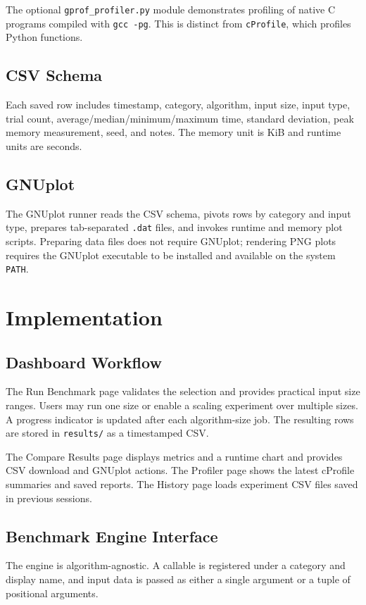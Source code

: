 \documentclass[11pt,a4paper]{report}
\begin{document}
The optional \texttt{gprof\_profiler.py} module demonstrates profiling of
native C programs compiled with \texttt{gcc -pg}. This is distinct from
\texttt{cProfile}, which profiles Python functions.

\section{CSV Schema}
Each saved row includes timestamp, category, algorithm, input size, input
type, trial count, average/median/minimum/maximum time, standard deviation,
peak memory measurement, seed, and notes. The memory unit is KiB and runtime
units are seconds.

\section{GNUplot}
The GNUplot runner reads the CSV schema, pivots rows by category and input
type, prepares tab-separated \texttt{.dat} files, and invokes runtime and
memory plot scripts. Preparing data files does not require GNUplot; rendering
PNG plots requires the GNUplot executable to be installed and available on
the system \texttt{PATH}.

\chapter{Implementation}

\section{Dashboard Workflow}
The Run Benchmark page validates the selection and provides practical input
size ranges. Users may run one size or enable a scaling experiment over
multiple sizes. A progress indicator is updated after each algorithm-size
job. The resulting rows are stored in \texttt{results/} as a timestamped CSV.

The Compare Results page displays metrics and a runtime chart and provides
CSV download and GNUplot actions. The Profiler page shows the latest
cProfile summaries and saved reports. The History page loads experiment CSV
files saved in previous sessions.

\section{Benchmark Engine Interface}
The engine is algorithm-agnostic. A callable is registered under a category
and display name, and input data is passed as either a single argument or a
tuple of positional arguments.
\end{document}
